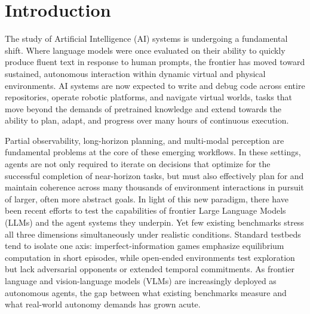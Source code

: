 
\section{Introduction}\label{sec:introduction}

The study of Artificial Intelligence (AI) systems is undergoing a fundamental shift. Where language models were once evaluated on their ability to quickly produce fluent text in response to human prompts, the frontier has moved toward sustained, autonomous interaction within dynamic virtual and physical environments. AI systems are now expected to write and debug code across entire repositories, operate robotic platforms, and navigate virtual worlds, tasks that move beyond the demands of pretrained knowledge and extend towards the ability to plan, adapt, and progress over many hours of continuous execution.

Partial observability, long-horizon planning, and multi-modal perception are fundamental problems at the core of these emerging workflows. In these settings, agents are not only required to iterate on decisions that optimize for the successful completion of near-horizon tasks, but must also effectively plan for and maintain coherence across many thousands of environment interactions in pursuit of larger, often more abstract goals. In light of this new paradigm, there have been recent efforts to test the capabilities of frontier Large Language Models (LLMs) and the agent systems they underpin. Yet few existing benchmarks stress all three dimensions simultaneously under realistic conditions. Standard testbeds tend to isolate one axis: imperfect-information games emphasize equilibrium computation in short episodes, while open-ended environments test exploration but lack adversarial opponents or extended temporal commitments. As frontier language and vision-language models (VLMs) are increasingly deployed as autonomous agents, the gap between what existing benchmarks measure and what real-world autonomy demands has grown acute.

